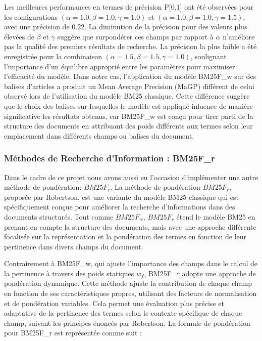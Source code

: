 \documentclass[a4paper, 12pt]{article}
\begin{document}
Les meilleures performances en termes de précision P[0,1] ont été observées pour les configurations \((\alpha=1.0, \beta=1.0, \gamma=1.0)\) et \((\alpha=1.0, \beta=1.0, \gamma=1.5)\), avec une précision de \(0.22\). La diminution de la précision pour des valeurs plus élevées de \(\beta\) et \(\gamma\) suggère que surpondérer ces champs par rapport à \(\alpha\) n'améliore pas la qualité des premiers résultats de recherche. La précision la plus faible a été enregistrée pour la combinaison \((\alpha=1.5, \beta=1.5, \gamma=1.0)\), soulignant l'importance d'un équilibre approprié entre les paramètres pour maximiser l'efficacité du modèle. 
Dans notre cas, l'application du modèle BM25F\_w sur des balises d'articles a produit un Mean Average Precision (MaGP) différent de celui observé lors de l'utilisation du modèle BM25 classique. Cette différence suggère que le choix des balises sur lesquelles le modèle est appliqué inluence de manière significative les résultats obtenus, car BM25F\_w est conçu pour tirer parti de la structure des documents en attribuant des poids différents aux termes selon leur emplacement dans différents champs ou balises du document.

\newpage


\subsubsection{Méthodes de Recherche d'Information : BM25F_r}
Dans le cadre de ce projet nous avons aussi eu l'occasion d'implémenter une autre méthode de pondération: $BM25F_r$. La méthode de pondération $BM25F_r$, proposée par Robertson, est une variante du modèle BM25 classique qui est spécifiquement conçue pour améliorer la recherche d'informations dans des documents structurés. Tout comme $BM25F_w$, $BM25F_r$ étend le modèle BM25 en prenant en compte la structure des documents, mais avec une approche différente focalisée sur la représentation et la pondération des termes en fonction de leur pertinence dans divers champs du document.

Contrairement à BM25F\_w, qui ajuste l'importance des champs dans le calcul de la pertinence à travers des poids statiques \(w_f\), BM25F\_r adopte une approche de pondération dynamique. Cette méthode ajuste la contribution de chaque champ en fonction de ses caractéristiques propres, utilisant des facteurs de normalisation et de pondération variables. Cela permet une évaluation plus précise et adaptative de la pertinence des termes selon le contexte spécifique de chaque champ, suivant les principes énoncés par Robertson.
La formule de pondération pour BM25F\_r est représentée comme suit :
\end{document}
